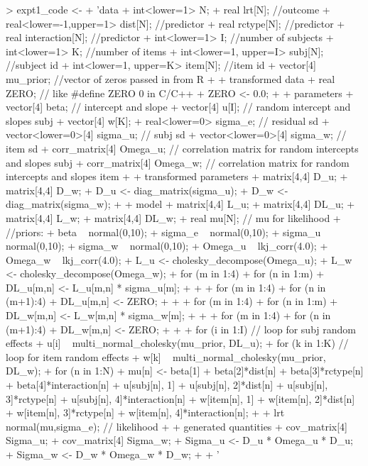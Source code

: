 \documentclass{article}
\begin{document}
\begin{Schunk}
\begin{Sinput}
> expt1_code <- 
+ 'data {
+ int<lower=1> N;
+ real lrt[N];                     //outcome
+ real<lower=-1,upper=1> dist[N];  //predictor
+ real rctype[N];                  //predictor
+ real interaction[N];             //predictor
+ int<lower=1> I;                  //number of subjects
+ int<lower=1> K;                  //number of items
+ int<lower=1, upper=I> subj[N];   //subject id
+ int<lower=1, upper=K> item[N];   //item id
+ vector[4] mu_prior;              //vector of zeros passed in from R
+ }
+ transformed data {
+ real ZERO;                      // like #define ZERO 0 in C/C++
+ ZERO <- 0.0;
+ }
+ parameters {
+ vector[4] beta;                 // intercept and slope
+ vector[4] u[I];                 // random intercept and slopes subj
+ vector[4] w[K];
+ real<lower=0> sigma_e;          // residual sd
+ vector<lower=0>[4] sigma_u;     // subj sd
+ vector<lower=0>[4] sigma_w;     // item sd
+ corr_matrix[4] Omega_u;           // correlation matrix for random intercepts and slopes subj
+ corr_matrix[4] Omega_w;           // correlation matrix for random intercepts and slopes item
+ }
+ transformed parameters {
+ matrix[4,4] D_u;
+ matrix[4,4] D_w;
+ D_u <- diag_matrix(sigma_u);
+ D_w <- diag_matrix(sigma_w);
+ }
+ model {
+ matrix[4,4] L_u;
+ matrix[4,4] DL_u;
+ matrix[4,4] L_w;
+ matrix[4,4] DL_w;
+ real mu[N]; // mu for likelihood
+ //priors:
+ beta ~ normal(0,10);
+ sigma_e ~ normal(0,10);
+ sigma_u ~ normal(0,10);
+ sigma_w ~ normal(0,10);
+ Omega_u ~ lkj_corr(4.0);
+ Omega_w ~ lkj_corr(4.0);
+ L_u <- cholesky_decompose(Omega_u);
+ L_w <- cholesky_decompose(Omega_w);
+ for (m in 1:4) {
+ for (n in 1:m) {
+ DL_u[m,n] <- L_u[m,n] * sigma_u[m];
+ }
+ }
+ for (m in 1:4){
+ for (n in (m+1):4){
+ DL_u[m,n] <- ZERO;
+ }
+ }
+ for (m in 1:4){
+ for (n in 1:m){
+ DL_w[m,n] <- L_w[m,n] * sigma_w[m];
+ }
+ }
+ for (m in 1:4){
+ for (n in (m+1):4){
+ DL_w[m,n] <- ZERO;
+ }
+ }
+ for (i in 1:I)                  // loop for subj random effects
+ u[i] ~ multi_normal_cholesky(mu_prior, DL_u);
+ for (k in 1:K)                  // loop for item random effects
+ w[k] ~ multi_normal_cholesky(mu_prior, DL_w);    
+ for (n in 1:N) {
+ mu[n] <- beta[1] + beta[2]*dist[n] + beta[3]*rctype[n] + beta[4]*interaction[n] + u[subj[n], 1] + u[subj[n], 2]*dist[n] + u[subj[n], 3]*rctype[n] + u[subj[n], 4]*interaction[n] + w[item[n], 1] + w[item[n], 2]*dist[n] + w[item[n], 3]*rctype[n] + w[item[n], 4]*interaction[n];
+ }
+ lrt ~ normal(mu,sigma_e);        // likelihood
+ }
+ generated quantities {
+ cov_matrix[4] Sigma_u;
+ cov_matrix[4] Sigma_w;
+ Sigma_u <- D_u * Omega_u * D_u;
+ Sigma_w <- D_w * Omega_w * D_w;
+ }
+ '
\end{Sinput}
\end{Schunk}
\end{document}
